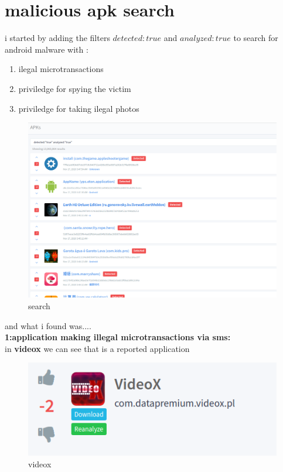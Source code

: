 \documentclass[10pt,a4paper]{article} %
\begin{document}
    \section{malicious apk search}
        i started by adding the filters $detected:true$ and $analyzed:true$ to search for android malware with :
        \begin{enumerate}
            \item {ilegal microtransactions}
            \item {priviledge for spying the victim }
            \item {priviledge for taking ilegal photos}
        \end{enumerate}
        \begin{figure}[h!]
            \centering
            \includegraphics[width=0.8\linewidth]{apks.png}
            \caption{search}
            \label{search}
        \end{figure}
        and what i found was....
        \\
        \textbf{1:application making illegal microtransactions via sms:}
        \\
        in \textbf{videox}  we can see that is a reported application
        \begin{figure}[h!]
            \centering
            \includegraphics[width=0.8\linewidth]{videox.png}
            \caption{videox}
            \label{videox}
        \end{figure}
\end{document}
